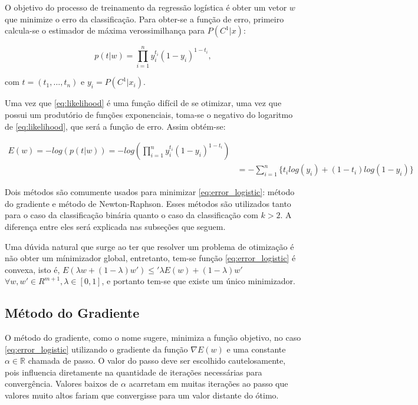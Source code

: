 O objetivo do processo de treinamento da regressão logística é obter um vetor $w$ que minimize
o erro da classificação. Para obter-se a função de erro, primeiro calcula-se o estimador
de máxima verossimilhança para $P(C^1 | x)$:

\begin{center}
	\begin{equation}
		\label{eq:likelihood}
		p(t | w) = \prod_{i = 1}^n y_i^{t_i}(1 - y_i)^{1 - t_i}	,
	\end{equation}
\end{center}

com $t = (t_1, \ldots, t_n)$ e $y_i = P(C^1 | x_i)$.

Uma vez que \ref{eq:likelihood} é uma função difícil de se otimizar, uma vez que possui um
produtório de funções exponenciais, toma-se o negativo do logaritmo de \ref{eq:likelihood},
que será a função de erro. Assim obtém-se:

\begin{center}
	\begin{equation}
		\begin{split}
			\label{eq:error_logistic}
			E(w) = - log(p(t | w)) = -log(\prod_{i = 1}^n y_i^{t_i}(1 - y_i)^{1 - t_i}	) \\
		 	& = - \sum_{i = 1}^{n} \{t_i log(y_i) + (1 - t_i) log(1 - y_i)\} 
		\end{split}
	\end{equation}
\end{center}

Dois métodos são comumente usados para minimizar \ref{eq:error_logistic}: 
método do gradiente e método de Newton-Raphson. Esses métodos são utilizados tanto para o caso da classificação binária quanto o caso da classificação com $k > 2$. A diferença entre eles será explicada
nas subseções que seguem.

Uma dúvida natural que surge ao ter que resolver um problema de otimização é não
obter um mínimizador global, entretanto, tem-se
função \ref{eq:error_logistic} é convexa, isto é, $E(\lambda w + (1 - \lambda ) w') \leq' \lambda E(w) 
	+ (1 - \lambda ) w'$
 $\forall w, w' \in R^{m + 1}, \lambda \in [0, 1]$, e portanto tem-se que existe um único minimizador.


\subsection{Método do Gradiente}\label{subsec:grad_descent}

O método do gradiente, como o nome sugere, minimiza a função objetivo, no caso \ref{eq:error_logistic}
utilizando o gradiente da função $\nabla E(w)$ e uma constante $\alpha \in \mathbb{R}$ chamada de
passo. O valor do passo deve ser escolhido cautelosamente, pois influencia diretamente na quantidade
de iterações necessárias para convergência. Valores baixos de $\alpha$ acarretam em muitas iterações
ao passo que valores muito altos fariam que convergisse para um valor distante do ótimo. 

